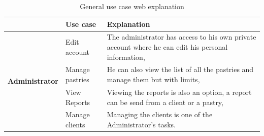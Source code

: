 \documentclass[12pt,a4paper]{report}
\begin{document}
	\begin{table}[H]
		\begin{center}
			\caption{\label{user-case-web-explanation} General use case web explanation} 
			\captionsetup[table]{skip=10pt}
			\setlength\doublerulesep{0.5pt}
			\begin{tabular}{|l|p{5cm}|p{8cm}| } 
				\hline\hline
				\rowcolor{LightCyan}
				& \textbf{Use case}      & \textbf{Explanation}                                                                                                                                \\
				\hline
				\hline
				\multirow{5}{*}{\textbf{Administrator} }
				
				& Edit account           & The administrator has access to his own private account where he can edit his personal information,                                                 \\
				\cline{2-3}
				& Manage pastries        & He can also view the list of all the pastries and manage them but with limits,                                                                      \\
				\cline{2-3}
				& View Reports           & Viewing the reports is also an option, a report can be send from a client or a pastry,                                                              \\
				\cline{2-3}
				& Manage clients         & Managing the clients is one of the Administrator's tasks.                                                                                           \\
				

\end{tabular}
\end{center}
\end{table}
\end{document}
